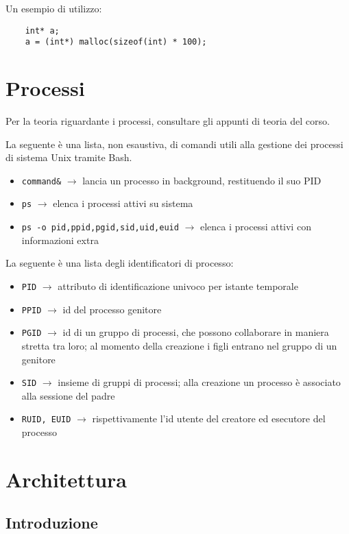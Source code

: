 \documentclass[11pt]{article}
\begin{document}
Un esempio di utilizzo:
\begin{verbatim}
    int* a;
    a = (int*) malloc(sizeof(int) * 100);
\end{verbatim}

\section{Processi}

Per la teoria riguardante i processi, consultare gli appunti di teoria del corso.

La seguente è una lista, non esaustiva, di comandi utili alla gestione dei processi di sistema Unix tramite Bash.

\begin{itemize}
    \item \verb|command&| $\rightarrow$ lancia un processo in background, restituendo il suo PID
    \item \verb|ps| $\rightarrow$ elenca i processi attivi su sistema
    \item \verb|ps -o pid,ppid,pgid,sid,uid,euid| $\rightarrow$ elenca i processi attivi con informazioni extra
\end{itemize}

La seguente è una lista degli identificatori di processo:

\begin{itemize}
    \item \verb|PID| $\rightarrow$ attributo di identificazione univoco per istante temporale
    \item \verb|PPID| $\rightarrow$ id del processo genitore
    \item \verb|PGID| $\rightarrow$ id di un gruppo di processi, che possono collaborare in maniera stretta tra loro; al momento della creazione i figli entrano nel gruppo di un genitore
    \item \verb|SID| $\rightarrow$ insieme di gruppi di processi; alla creazione un processo è associato alla sessione del padre
    \item \verb|RUID, EUID| $\rightarrow$ rispettivamente l'id utente del creatore ed esecutore del processo
\end{itemize}

\section{Architettura}

\subsection{Introduzione}
\end{document}
